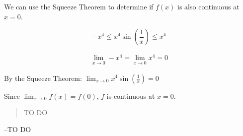 \documentclass[letterpaper, landscape]{exam}
\begin{document}
\begin{description}
        We can use the Squeeze Theorem to determine if $f(x)$ is also continuous at
        $x = 0$.

        \[
          -x^4 \leq x^4 \sin \left( \frac{1}{x} \right) \leq x^4
        \]

        \begin{align*}
          \lim_{x \to 0} -x^4 = \lim_{x \to 0} x^4 = 0
        \end{align*}

        By the Squeeze Theorem: $\lim_{x \to 0} x^4 \sin \left( \frac{1}{x} \right) = 0$

        Since $\lim_{x \to 0} f(x) = f(0)$, $f$ is continuous at $x = 0$.



    \end{description}

  \else
    \vspace{10 cm}
    \begin{quote}
      \begin{em}
        TO DO
      \end{em}
    \end{quote}
    \hspace{1 cm} --TO DO
  \fi
\end{document}
